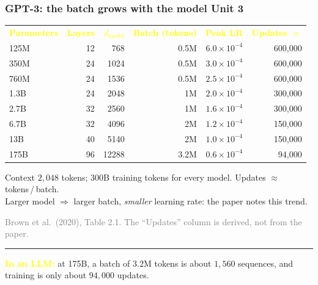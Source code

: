 \documentclass[12pt]{beamer}
\newcommand{\FrameTitle}[2]{\frametitle{#1 \hfill \small\textnormal{\textcolor{midgray}{#2}}}}
\begin{document}
\begin{frame}\FrameTitle{GPT-3: the batch grows with the model}{Unit 3}
\centering\footnotesize
\begin{tabular}{@{}lrrrrr@{}}
\textcolor{yellow}{\textbf{Parameters}} & \textcolor{yellow}{\textbf{Layers}} & \textcolor{yellow}{\textbf{$d_{\text{model}}$}} &
\textcolor{yellow}{\textbf{Batch (tokens)}} & \textcolor{yellow}{\textbf{Peak LR}} & \textcolor{yellow}{\textbf{Updates $\approx$}}\\[0.5mm]
125M & 12 & 768   & 0.5M & $6.0\times10^{-4}$ & 600{,}000\\
350M & 24 & 1024  & 0.5M & $3.0\times10^{-4}$ & 600{,}000\\
760M & 24 & 1536  & 0.5M & $2.5\times10^{-4}$ & 600{,}000\\
1.3B & 24 & 2048  & 1M   & $2.0\times10^{-4}$ & 300{,}000\\
2.7B & 32 & 2560  & 1M   & $1.6\times10^{-4}$ & 300{,}000\\
6.7B & 32 & 4096  & 2M   & $1.2\times10^{-4}$ & 150{,}000\\
13B  & 40 & 5140  & 2M   & $1.0\times10^{-4}$ & 150{,}000\\
175B & 96 & 12288 & 3.2M & $0.6\times10^{-4}$ & 94{,}000
\end{tabular}
\par\vspace{2mm}
\begin{flushleft}\small
Context $2{,}048$ tokens; $300$B training tokens for every model. Updates $\approx$ tokens\,/\,batch.\\
Larger model $\Rightarrow$ larger batch, \emph{smaller} learning rate: the paper notes this trend.
\end{flushleft}
{\par\vspace{1mm}\footnotesize\textcolor{gray}{Brown et al.\ (2020), Table 2.1. The ``Updates'' column is derived, not from the paper.}\par}
\vfill
{\color{yellow}\rule{\linewidth}{0.5pt}}\par\vspace{1mm}
{\raggedright\small\textcolor{yellow}{\textbf{In an LLM:}} at 175B, a batch of $3.2$M tokens is about $1{,}560$ sequences, and training is only about $94{,}000$ updates.\par}
\end{frame}
\end{document}

